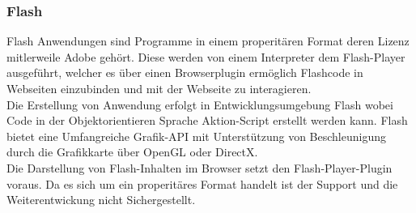 \subsubsection{Flash}
\label{sec:Flash}
Flash Anwendungen sind Programme in einem properitären Format deren Lizenz mitlerweile Adobe gehört.
Diese werden von einem Interpreter dem Flash-Player ausgeführt, welcher es über einen Browserplugin ermöglich Flashcode in Webseiten einzubinden und mit der Webseite zu interagieren.
\\
Die Erstellung von Anwendung erfolgt in Entwicklungsumgebung Flash wobei Code in der Objektorientieren Sprache Aktion-Script erstellt werden kann.
Flash bietet eine Umfangreiche Grafik-API mit Unterstützung von Beschleunigung durch die Grafikkarte über OpenGL oder DirectX.
\\
Die Darstellung von Flash-Inhalten im Browser setzt den Flash-Player-Plugin voraus.
Da es sich um ein properitäres Format handelt ist der Support und die Weiterentwickung nicht Sichergestellt.\cite{flash-14}
